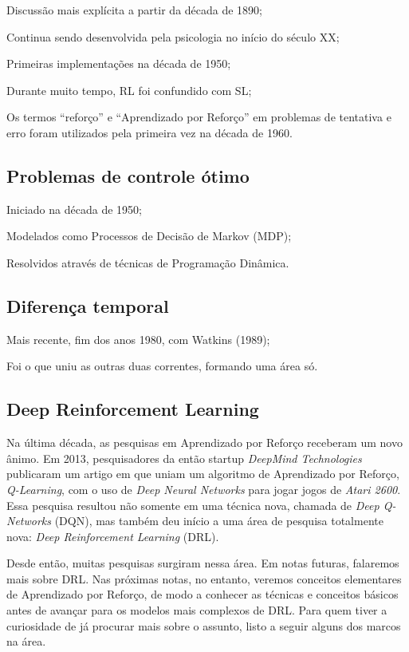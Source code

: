 \documentclass{article}
\begin{document}
            Discussão mais explícita a partir da década de 1890;
            
            Continua sendo desenvolvida pela psicologia no início do século XX;
            
            Primeiras implementações na década de 1950;
            
            Durante muito tempo, RL foi confundido com SL;
            
            Os termos “reforço” e “Aprendizado por Reforço” em problemas de tentativa e erro foram utilizados pela primeira vez na década de 1960.
    
        
        \subsection{Problemas de controle ótimo}
            Iniciado na década de 1950;
            
            Modelados como Processos de Decisão de Markov (MDP);
            
            Resolvidos através de técnicas de Programação Dinâmica.
    
        
        \subsection{Diferença temporal}
            Mais recente, fim dos anos 1980, com Watkins     (1989);
            
            Foi o que uniu as outras duas correntes, formando uma área só.
        
        \subsection{Deep Reinforcement Learning}
        
            Na última década, as pesquisas em Aprendizado por Reforço receberam um novo ânimo. Em 2013, pesquisadores da então startup \emph{DeepMind Technologies} publicaram um artigo em que uniam um algoritmo de Aprendizado por Reforço, \emph{Q-Learning}, com o uso de \emph{Deep Neural Networks} para jogar jogos de \emph{Atari 2600}. Essa pesquisa resultou não somente em uma técnica nova, chamada de \emph{Deep Q-Networks} (DQN), mas também deu início a uma área de pesquisa totalmente nova: \emph{Deep Reinforcement Learning} (DRL). 
            
            Desde então, muitas pesquisas surgiram nessa área. Em notas futuras, falaremos mais sobre DRL. Nas próximas notas, no entanto, veremos conceitos elementares de Aprendizado por Reforço, de modo a conhecer as técnicas e conceitos básicos antes de avançar para os modelos mais complexos de DRL. Para quem tiver a curiosidade de já procurar mais sobre o assunto, listo a seguir alguns dos marcos na área.
            
\end{document}
